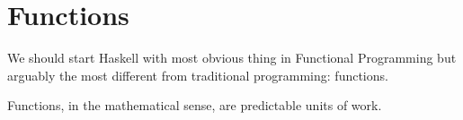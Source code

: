 \chapter{Functions}
We should start Haskell with most obvious thing in Functional Programming but arguably the most different from traditional programming: functions. 

Functions, in the mathematical sense, are predictable units of work.  
